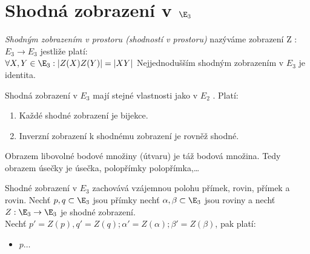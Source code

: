 
\let\braceru=\relax \let\bracelu=\relax 
\def\o#1{\setbox0=
	\hbox{$\kern2pt\overbrace{\kern-2pt#1\kern-2pt}\kern2pt$}\ht0=2.1ex\box0}
\def\to#1{\hbox{#1\rlap{\t{}}}}
\def\rad{\rm{rad}}
\def\f{\frac}
\section{Shodná zobrazení v $\E_3$}

\Def \emph{Shodným zobrazením v prostoru (shodností v prostoru)} nazýváme zobrazení Z : $E_3 \rightarrow E_3$
jestliže platí:\\
$\forall X,Y \in \E_3 : |Z(X)Z(Y)|=|XY|$
\Pozenum Nejjednodušším shodným zobrazením v $E_3$ je identita.
\item  Shodná zobrazení v $E_3$ mají stejné vlastnosti jako v $E_2$ .
\End
\V 
Platí:
\begin{enumerate}
	\item Každé shodné zobrazení je bijekce.
	\item Inverzní zobrazení k shodnému zobrazení je rovněž shodné.
\end{enumerate}
\Pozenum
Obrazem libovolné bodové množiny (útvaru) je táž bodová množina. Tedy obrazem
úsečky je úsečka, polopřímky polopřímka,\dots
\item Shodné zobrazení v $E_3$ zachovává vzájemnou polohu přímek, rovin, přímek a rovin.
\End
\V Nechť $p , q \subset \E_3$ jsou přímky nechť $\alpha,\beta \subset \E_3$ jsou roviny a nechť $Z : \E_3 \rightarrow \E_3$ je
shodné zobrazení.\\
Nechť $p'=Z(p), q'=Z(q); \alpha'=Z(\alpha); \beta'=Z(\beta)$, pak platí:
\begin{itemize}
	\item $p\dots$
\end{itemize}

\EndDoc


